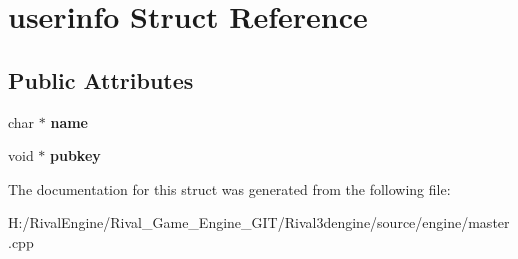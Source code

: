 \hypertarget{structuserinfo}{}\section{userinfo Struct Reference}
\label{structuserinfo}
\subsection*{Public Attributes}
\begin{DoxyCompactItemize}
\item 
\mbox{\label{structuserinfo_ad49f06e9e031c9fddbca63cebb8b9467}} 
char $\ast$ {\bfseries name}
\item 
\mbox{\label{structuserinfo_a9b4a045499a86721b6f451302312e152}} 
void $\ast$ {\bfseries pubkey}
\end{DoxyCompactItemize}


The documentation for this struct was generated from the following file\+:\begin{DoxyCompactItemize}
\item 
H\+:/\+Rival\+Engine/\+Rival\+\_\+\+Game\+\_\+\+Engine\+\_\+\+G\+I\+T/\+Rival3dengine/source/engine/master.\+cpp\end{DoxyCompactItemize}
